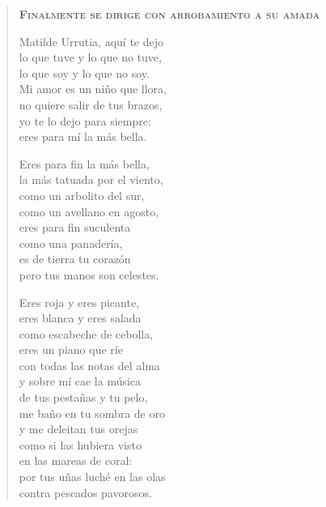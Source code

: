 \documentclass[12pt]{article}
\begin{document}
\begin{verse}
{\bfseries\scshape {Finalmente se dirige con arrobamiento a su amada}}

Matilde Urrutia, aquí te dejo\\
lo que tuve y lo que no tuve,\\
lo que soy y lo que no soy.\\
Mi amor es un niño que llora,\\
no quiere salir de tus brazos,\\
yo te lo dejo para siempre:\\
eres para mí la más bella.  

Eres para fin la más bella,\\
la más tatuada por el viento,\\
como un arbolito del sur,\\
como un avellano en agosto,\\
eres para fin suculenta\\
como una panadería,\\
es de tierra tu corazón\\
pero tus manos son celestes.  

Eres roja y eres picante,\\
eres blanca y eres salada\\
como escabeche de cebolla,\\
eres un piano que ríe\\
con todas las notas del alma\\
y sobre mí cae la música\\
de tus pestañas y tu pelo,\\
me baño en tu sombra de oro\\
y me deleitan tus orejas\\
como si las hubiera visto\\
en las mareas de coral:\\
por tus uñas luché en las olas\\
contra pescados pavorosos.  


\end{verse}
\end{document}
